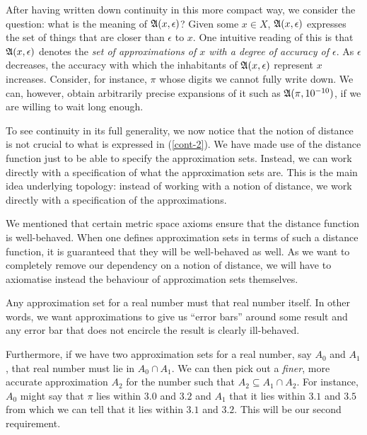 After having written down continuity in this more compact way, we consider the question:
what is the meaning of $\mathfrak{A}(x, \epsilon)$? Given some $x \in X$, $\mathfrak{A}(x, \epsilon)$ expresses the set
of things that are closer than $\epsilon$ to $x$. One intuitive reading of this is that
$\mathfrak{A}(x, \epsilon)$ denotes the \emph{set of approximations of $x$ with a degree of accuracy of
$\epsilon$}. As $\epsilon$ decreases, the accuracy with which the inhabitants of $\mathfrak{A}(x, \epsilon)$
represent $x$ increases. Consider, for instance, $\pi$ whose digits we cannot fully write
down. We can, however, obtain arbitrarily precise expansions of it such as
$\mathfrak{A}(\pi, 10^{-10})$, if we are willing to wait long enough.

To see continuity in its full generality, we now notice that the notion of distance is not
crucial to what is expressed in (\ref{cont-2}). We have made use of the distance function
just to be able to specify the approximation sets. Instead, we can work directly with a
specification of what the approximation sets are. This is the main idea underlying
topology: instead of working with a notion of distance, we work directly with a
specification of the approximations.

We mentioned that certain metric space axioms ensure that the distance function is
well-behaved. When one defines approximation sets in terms of such a distance function, it
is guaranteed that they will be well-behaved as well. As we want to completely remove our
dependency on a notion of distance, we will have to axiomatise instead the behaviour of
approximation sets themselves.

Any approximation set for a real number must that real number itself. In other words, we
want approximations to give us ``error bars'' around some result and any error bar that
does not encircle the result is clearly ill-behaved.

Furthermore, if we have two approximation sets for a real number, say $A_0$ and $A_1$,
that real number must lie in $A_0 \cap A_1$. We can then pick out a \emph{finer}, more
accurate approximation $A_2$ for the number such that $A_2 \subseteq A_1 \cap A_2$. For instance,
$A_0$ might say that $\pi$ lies within $3.0$ and $3.2$ and $A_1$ that it lies within $3.1$
and $3.5$ from which we can tell that it lies within $3.1$ and $3.2$. This will be our
second requirement.

